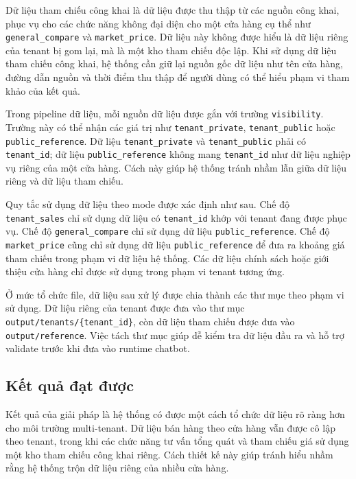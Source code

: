 \documentclass[../DoAn.tex]{subfiles}
\begin{document}
Dữ liệu tham chiếu công khai là dữ liệu được thu thập từ các nguồn công khai, phục vụ cho các chức năng không đại diện cho một cửa hàng cụ thể như \texttt{general\_compare} và \texttt{market\_price}. Dữ liệu này không được hiểu là dữ liệu riêng của tenant bị gom lại, mà là một kho tham chiếu độc lập. Khi sử dụng dữ liệu tham chiếu công khai, hệ thống cần giữ lại nguồn gốc dữ liệu như tên cửa hàng, đường dẫn nguồn và thời điểm thu thập để người dùng có thể hiểu phạm vi tham khảo của kết quả.

Trong pipeline dữ liệu, mỗi nguồn dữ liệu được gắn với trường \texttt{visibility}. Trường này có thể nhận các giá trị như \texttt{tenant\_private}, \texttt{tenant\_public} hoặc \texttt{public\_reference}. Dữ liệu \texttt{tenant\_private} và \texttt{tenant\_public} phải có \texttt{tenant\_id}; dữ liệu \texttt{public\_reference} không mang \texttt{tenant\_id} như dữ liệu nghiệp vụ riêng của một cửa hàng. Cách này giúp hệ thống tránh nhầm lẫn giữa dữ liệu riêng và dữ liệu tham chiếu.

Quy tắc sử dụng dữ liệu theo mode được xác định như sau. Chế độ \texttt{tenant\_sales} chỉ sử dụng dữ liệu có \texttt{tenant\_id} khớp với tenant đang được phục vụ. Chế độ \texttt{general\_compare} chỉ sử dụng dữ liệu \texttt{public\_reference}. Chế độ \texttt{market\_price} cũng chỉ sử dụng dữ liệu \texttt{public\_reference} để đưa ra khoảng giá tham chiếu trong phạm vi dữ liệu hệ thống. Các dữ liệu chính sách hoặc giới thiệu cửa hàng chỉ được sử dụng trong phạm vi tenant tương ứng.

Ở mức tổ chức file, dữ liệu sau xử lý được chia thành các thư mục theo phạm vi sử dụng. Dữ liệu riêng của tenant được đưa vào thư mục \texttt{output/tenants/\{tenant\_id\}}, còn dữ liệu tham chiếu được đưa vào \texttt{output/reference}. Việc tách thư mục giúp dễ kiểm tra dữ liệu đầu ra và hỗ trợ validate trước khi đưa vào runtime chatbot.

\subsection{Kết quả đạt được}
\label{subsection:5.2.3}

Kết quả của giải pháp là hệ thống có được một cách tổ chức dữ liệu rõ ràng hơn cho môi trường multi-tenant. Dữ liệu bán hàng theo cửa hàng vẫn được cô lập theo tenant, trong khi các chức năng tư vấn tổng quát và tham chiếu giá sử dụng một kho tham chiếu công khai riêng. Cách thiết kế này giúp tránh hiểu nhầm rằng hệ thống trộn dữ liệu riêng của nhiều cửa hàng.
\end{document}
